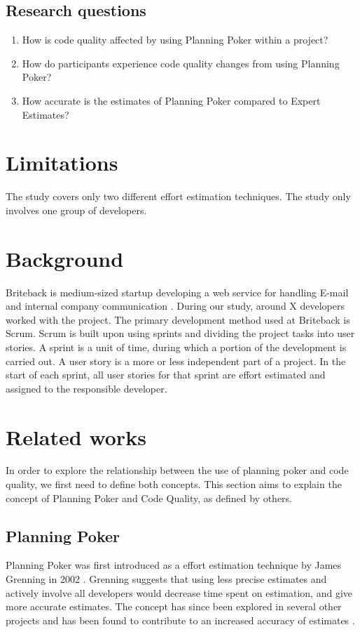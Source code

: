 \documentclass{sigchi}
\begin{document}
\subsection{Research questions}
\begin{enumerate}
	\item How is code quality affected by using Planning Poker within a project?
	\item How do participants experience code quality changes from using Planning Poker?

	\item How accurate is the estimates of Planning Poker compared to Expert Estimates?

\end{enumerate}

\section{Limitations}
The study covers only two different effort estimation techniques.
The study only involves one group of developers.

\section{Background}
Briteback is medium-sized startup developing a web service for handling E-mail and internal company communication \cite{Briteback}. During our study, around X developers worked with the project.
The primary development method used at Briteback is Scrum. Scrum is built upon using sprints and dividing the project tasks into user stories\cite{jongerius2014get}. A sprint is a unit of time, during which a portion of the development is carried out. A user story is a more or less independent part of a project. In the start of each sprint, all user stories for that sprint are effort estimated and assigned to the responsible developer.

\section{Related works}
In order to explore the relationship between the use of planning poker and code quality, we first need to define both concepts. This section aims to explain the concept of Planning Poker and Code Quality, as defined by others.

\subsection{Planning Poker}
Planning Poker was first introduced as a effort estimation technique by James Grenning in 2002 \cite{grenning2002planning}.
Grenning suggests that using less precise estimates and actively involve all developers would
decrease time spent on estimation, and give more accurate estimates. The concept has since been explored in several other projects and has been found to contribute to an increased accuracy of estimates \cite{Mahni20122086,1667560}.
\end{document}
